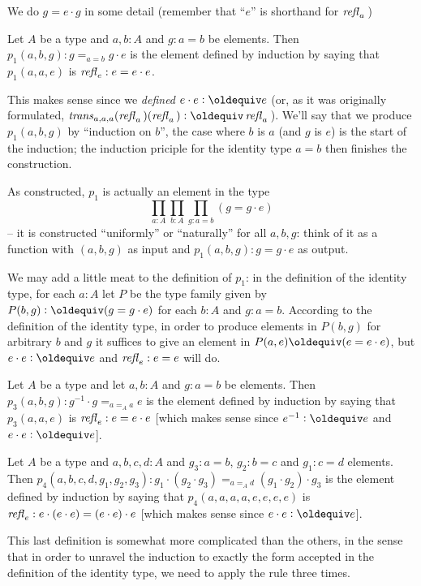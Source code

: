 We do $g=e\cdot g$ in some detail (remember that ``$e$'' is shorthand for $\mathop{{\it refl}_{a}}{}$)
\begin{definition}\label{def:p1}
  Let $A$ be a type and $a, b:A$ and $g:a=b$ be elements.  Then $p_1(a,b,g):g=_{a=b}g\cdot e$ is the element defined by induction by saying that $p_1(a,a,e)$ is $\mathop{{\it refl}_{e}}:e=e\cdot e$.
\end{definition}
\begin{remark}
  This makes sense since we \emph{defined} $e\cdot e\defequi e$ (or, as it was originally formulated, $\trans_{a,a,a}(\refl a{})(\refl a{})\defequi \refl a{}$).  We'll say that we produce $p_1(a,b,g)$ by ``induction on $b$'', the case where $b$ is $a$ (and $g$ is $e$) is the start of the induction; the induction priciple for the identity type $a=b$ then finishes the construction.

As constructed, $p_1$ is actually an element in the type
$$\prod_{a:A}\prod_{b:A}\prod_{g:a=b}(g=g\cdot e)$$ -- it is constructed ``uniformly'' or ``naturally'' for all $a,b,g$: think of it as a function with $(a,b,g)$ as input and $p_1(a,b,g):g=g\cdot e$ as output.

We may add a little meat to the definition of $p_1$: in the definition of the identity type, for each $a:A$ let $P$ be the type family given by $P(b,g)\defequi (g=g\cdot e)$ for each $b:A$ and $g:a=b$.  According to the definition of the identity type, in order to produce elements in $P(b,g)$ for arbitrary $b$ and $g$ it suffices to give an element in $P(a,e)\oldequiv (e=e\cdot e)$, but $e\cdot e\defequi e$ and $\mathop{{\it refl}_{e}}:e=e$ will do.
\end{remark}
\begin{definition}\label{def:p3}
  Let $A$ be a type and let $a,b:A$ and $g:a=b$ be elements.  Then $p_3(a,b,g):g^{-1}\cdot g=_{a=_Aa} e$ is the element defined by induction by saying that $p_3(a,a,e)$ is $\mathop{{\it refl}_{e}}:e=e\cdot e$ [which makes sense since $e^{-1}\defequi e$ and $e\cdot e\defequi e$].
\end{definition}
\begin{definition}\label{def:p4}
  Let $A$ be a type and $a,b,c,d:A$ and $g_3:a=b$, $g_2:b=c$ and $g_1:c=d$ elements.  Then $p_4(a,b,c,d,g_1,g_2,g_3):g_1\cdot(g_2\cdot g_3)=_{a=_Ad}(g_1\cdot g_2)\cdot g_3$ is the element defined by induction by saying that $p_4(a,a,a,a,e,e,e,e)$ is $\mathop{{\it refl}_{e}}:e\cdot(e\cdot e)=(e\cdot e)\cdot e$ [which makes sense since $e\cdot e\defequi e$].
\end{definition}
\begin{remark}
  This last definition is somewhat more complicated than the others, in the sense that in order to unravel the induction to exactly the form accepted in the definition of the identity type, we need to apply the rule three times.  %
\end{remark}

